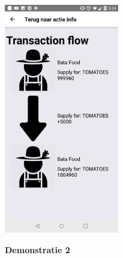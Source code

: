 \begin{center}
	\includegraphics[width=5cm]{img/react-demo-1-3}\\[1cm]
\end{center}

\textbf{Demonstratie 2}

